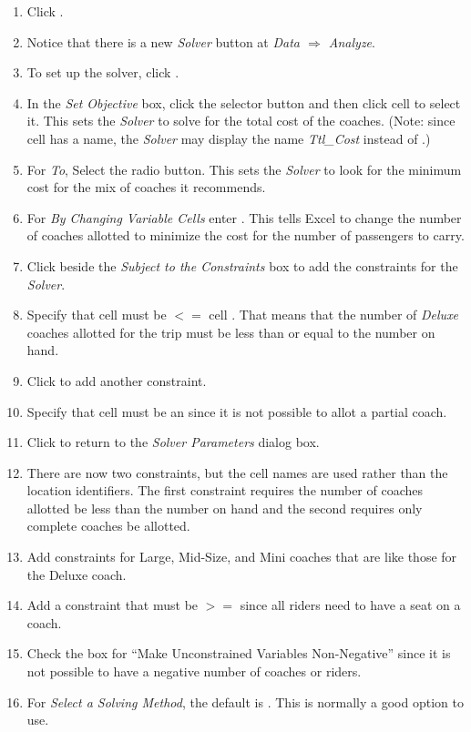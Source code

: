 \begin{enumbox}
\begin{enumerate}
		\item Click .
		\item Notice that there is a new \textit{Solver} button at \textit{Data $ \Rightarrow $ Analyze}.
		\item To set up the solver, click .
		\item In the \textit{Set Objective} box, click the selector button and then click cell  to select it. This sets the \textit{Solver} to solve for the total cost of the coaches. (Note: since cell  has a name, the \textit{Solver}  may display the name \textit{Ttl\_Cost} instead of .)
		\item For \textit{To}, Select the  radio button. This sets the \textit{Solver} to look for the minimum cost for the mix of coaches it recommends.
		\item For \textit{By Changing Variable Cells} enter . This tells Excel to change the number of coaches allotted to minimize the cost for the number of passengers to carry.
		\item Click  beside the \textit{Subject to the Constraints} box to add the constraints for the \textit{Solver}.
		\item Specify that cell  must be $ <= $ cell . That means that the number of \textit{Deluxe} coaches allotted for the trip must be less than or equal to the number on hand.
		\item Click  to add another constraint.
		\item Specify that cell  must be an  since it is not possible to allot a partial coach.
		\item Click  to return to the \textit{Solver Parameters} dialog box. 
		\item There are now two constraints, but the cell names are used rather than the location identifiers. The first constraint requires the number of coaches allotted be less than the number on hand and the second requires only complete coaches be allotted.
		\item Add constraints for Large, Mid-Size, and Mini coaches that are like those for the Deluxe coach.
		\item Add a constraint that  must be $ >= $  since all riders need to have a seat on a coach.
		\item Check the box for ``Make Unconstrained Variables Non-Negative'' since it is not possible to have a negative number of coaches or riders.
		 \item For \textit{Select a Solving Method}, the default is . This is normally a good option to use.


\end{enumerate}
\end{enumbox}
